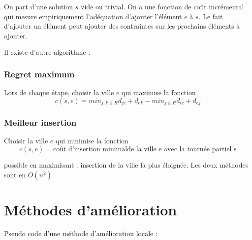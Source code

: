 \documentclass[11pt,a4paper]{report}
\begin{document}
On part d'une solution $s$ vide ou trivial. On a une fonction de coût incrémental qui mesure empiriquement l'adéquation d'ajouter l'élément $e$ à $s$. Le fait d'ajouter un élément peut ajouter des contraintes sur les prochains éléments à ajouter.

\begin{algorithm}[H]

\end{algorithm}

Il existe d'autre algorithme :

\subsection{Regret maximum}
Lors de chaque étape, choisir la ville $e$ qui maximise la fonction
$$
c(s,e) = min_{j,k \in R}d_{je} + d_{ek} - min_{j \in R} d_{ie} + d_{ej}
$$ 

\subsection{Meilleur insertion}
Choisir la ville $e$ qui minimise la fonction
$$
c(s,e) = \text{coût d'insertion minimalde la ville e avec la tournée partiel s}
$$

possible en maximisant : insertion de la ville la plus éloignée. Les deux méthodes sont en $O(n^2)$


\chapter{Méthodes d'amélioration}

Pseudo code d'une méthode d'amélioration locale :

\begin{algorithm}[H]
\end{algorithm}
\end{document}
